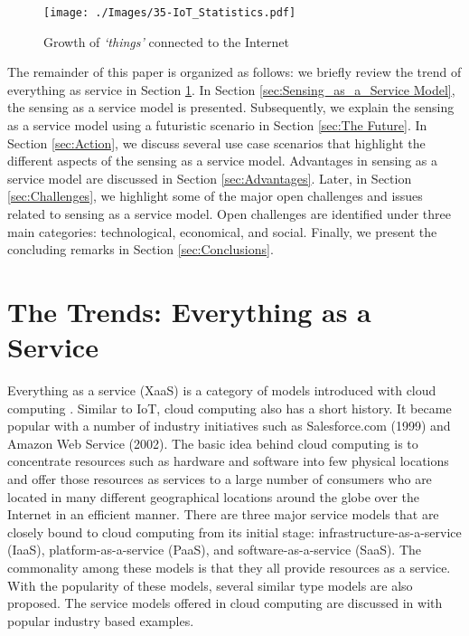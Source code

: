 \documentclass[times]{ettauth}
\begin{document}
\begin{figure}[t]
 \centering
 \texttt{[image: ./Images/35-IoT\_Statistics.pdf]}
\caption{Growth of \textit{`things'} connected to the Internet \cite{P574}}
 \label{Figure:IoT_Statistics}	
\end{figure}


The remainder of this paper is organized as follows: we briefly review the trend of everything as service in Section \ref{sec:The_Trends}. In Section \ref{sec:Sensing_as_a_Service Model}, the sensing as a service model is presented. Subsequently, we explain the sensing as a service model using a futuristic scenario in Section \ref{sec:The Future}. In Section \ref{sec:Action}, we discuss several use case scenarios that highlight the different aspects of the sensing as a service model. Advantages in sensing as a service model are discussed in Section \ref{sec:Advantages}. Later, in Section \ref{sec:Challenges}, we highlight some of the major open challenges and issues related to sensing as a service model. Open challenges are identified under three main categories: technological, economical, and social. Finally, we present the concluding remarks in Section \ref{sec:Conclusions}.





\section{The Trends: Everything as a Service}
\label{sec:The_Trends}



Everything as a service (XaaS) \cite{P533} is a category of models introduced with cloud computing \cite{P498}. Similar to IoT, cloud computing also has a short history. It became popular with a number of industry initiatives such as Salesforce.com (1999) and Amazon Web Service (2002). The basic idea behind cloud computing is to concentrate resources such as hardware and software into few physical locations and offer those resources as services to a large number of consumers who are located in many different geographical locations around the globe over the Internet in an efficient manner. There are three major service models that are closely bound to cloud computing from its initial stage: infrastructure-as-a-service (IaaS), platform-as-a-service (PaaS), and software-as-a-service (SaaS). The commonality among these models is that they all provide resources as a service. With the popularity of these models, several similar type models are also proposed. The service models offered in cloud computing are discussed in \cite{P502} with popular industry based examples.
\end{document}
